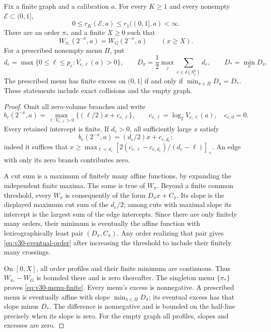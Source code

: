 \begin{theorem}
\label{thm:v30-menu-finite}
Fix a finite graph and a calibration $a$. For every $K\ge1$ and every
nonempty $\mathcal E\subset(0,1]$,
\begin{equation}\label{eq:v30-menu-finite}
 0\le r_K(\mathcal E,a)\le r_1((0,1],a)<\infty.
\end{equation}
There are an order $\pi_*$ and a finite $X\ge0$ such that
\begin{equation}\label{eq:v30-eventual-order}
 W_{\pi_*}(2^{-x},a)=W_G(2^{-x},a)\qquad(x\ge X).
\end{equation}
For a prescribed nonempty menu $\Pi$, put
\[
 d_e=\max\{0\le\ell\le p_e:V_{e,\ell}(a)>0\},\qquad
 D_\pi=\frac12\max_j\sum_{e\in\delta(S_j^\pi)}d_e,\qquad
 D_* =\min_\pi D_\pi.
\]
The prescribed menu has finite excess on $(0,1]$ if and only if
$\min_{\pi\in\Pi}D_\pi=D_*$. These statements include exact
collisions and the empty graph.
\end{theorem}
\begin{proof}
Omit all zero-volume branches and write
\[
 b_e(2^{-x},a)=\max_{\ell:V_{e,\ell}>0}
                 \{(\ell/2)x+c_{e,\ell}\},\qquad
 c_{e,\ell}=\log_2V_{e,\ell}(a),\quad c_{e,0}=0.
\]
Every retained intercept is finite. If $d_e>0$, all sufficiently
large $x$ satisfy
\[
 b_e(2^{-x},a)=(d_e/2)x+c_{e,d_e};
\]
indeed it suffices that
$x\ge\max_{\ell<d_e}[2(c_{e,\ell}-c_{e,d_e})/(d_e-\ell)]_+$.
An edge with only its zero branch contributes zero.

A cut sum is a maximum of finitely many affine functions, by expanding
the independent finite maxima. The same is true of $W_\pi$.
Beyond a finite common threshold, every $W_\pi$ is consequently of
the form $D_\pi x+C_\pi$. Its slope is the displayed maximum cut
sum of the $d_e/2$; among cuts with maximal slope its intercept is
the largest sum of the edge intercepts. Since there are only finitely
many orders, their minimum is eventually the affine function with
lexicographically least pair $(D_\pi,C_\pi)$. Any order realizing
that pair gives \eqref{eq:v30-eventual-order} after increasing the
threshold to include their finitely many crossings.

On $[0,X]$, all order profiles and their finite minimum are continuous.
Thus $W_{\pi_*}-W_G$ is bounded there and is zero thereafter. The
singleton menu $\{\pi_*\}$ proves \eqref{eq:v30-menu-finite}.
Every menu's excess is nonnegative. A prescribed menu is eventually
affine with slope $\min_{\pi\in\Pi}D_\pi$; its eventual excess has
that slope minus $D_*$. The difference is nonnegative and is bounded
on the half-line precisely when its slope is zero. For the empty graph
all profiles, slopes and excesses are zero.
\end{proof}

